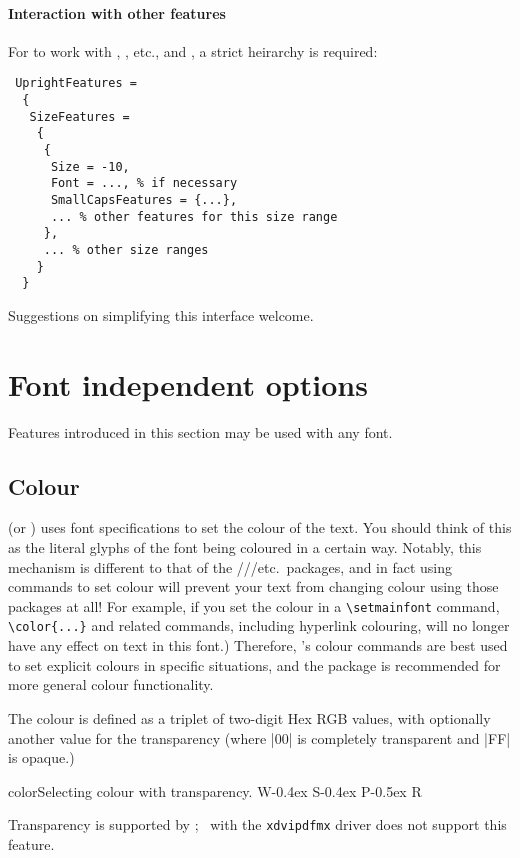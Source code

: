 \documentclass[a4paper]{l3doc}
\begin{document}
\paragraph{Interaction with other features}
For  to work with , , etc., and , a strict heirarchy is required:
\begin{Verbatim}
 UprightFeatures =
  {
   SizeFeatures =
    {
     {
      Size = -10,
      Font = ..., % if necessary
      SmallCapsFeatures = {...},
      ... % other features for this size range
     },
     ... % other size ranges
    }
  }
\end{Verbatim}
Suggestions on simplifying this interface welcome.


\section{Font independent options}
\label{sec:font-ind-features}

Features introduced in this section may be used with any font.

\subsection{Colour}

 (or ) uses font specifications to set the colour of
the text.
You should think of this as the literal glyphs of the font being coloured in a certain way.
Notably, this mechanism is different to that of the ///etc.\ packages, and in fact using  commands to set colour will prevent your text from changing colour using those packages at all!
For example, if you set the colour in a \verb|\setmainfont| command, \verb|\color{...}| and related commands, including hyperlink colouring, will no longer have any effect on text in this font.)
Therefore, 's colour commands are best used to set explicit colours in specific situations, and the  package is recommended for more general colour functionality.

The colour is defined as a triplet of two-digit Hex RGB
values, with optionally another value for the transparency (where
|00| is completely transparent and |FF| is opaque.)
\begin{Lexample}{color}{Selecting colour with transparency.}
  \fontsize{48}{48}
  {W}\kern-0.4ex
  {S}\kern-0.4ex
  {P}\kern-0.5ex
  {R}
\end{Lexample}
Transparency is supported by \LuaLaTeX; \XeLaTeX\ with the \texttt{xdvipdfmx} driver
does not support this feature.
\end{document}
